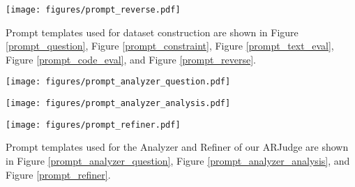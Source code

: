 \begin{figure*}[t!]
	\centering
	\texttt{[image: figures/prompt\_reverse.pdf]}
	\caption{Prompt template for reverse validation.}
	\label{prompt_reverse}
\end{figure*}

Prompt templates used for dataset construction are shown in Figure \ref{prompt_question}, Figure \ref{prompt_constraint}, Figure \ref{prompt_text_eval}, Figure \ref{prompt_code_eval}, and Figure \ref{prompt_reverse}.

\begin{figure*}[t!]
	\centering
	\texttt{[image: figures/prompt\_analyzer\_question.pdf]}
	\caption{Prompt template for question generation of the Analyzer.}
	\label{prompt_analyzer_question}
\end{figure*}

\begin{figure*}[t!]
	\centering
	\texttt{[image: figures/prompt\_analyzer\_analysis.pdf]}
	\caption{Prompt template for multi-faceted analysis of the Analyzer.}
	\label{prompt_analyzer_analysis}
\end{figure*}

\begin{figure*}[t!]
	\centering
	\texttt{[image: figures/prompt\_refiner.pdf]}
	\caption{Prompt template for refinement of the Refiner.}
	\label{prompt_refiner}
\end{figure*}

Prompt templates used for the Analyzer and Refiner of our ARJudge are shown in Figure \ref{prompt_analyzer_question}, Figure \ref{prompt_analyzer_analysis}, and Figure \ref{prompt_refiner}.